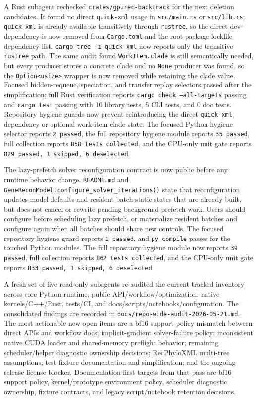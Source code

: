 \documentclass[11pt]{article}
\begin{document}
A Rust subagent rechecked \texttt{crates/gpurec-backtrack} for the next
deletion candidates.  It found no direct \texttt{quick-xml} usage in
\texttt{src/main.rs} or \texttt{src/lib.rs}; \texttt{quick-xml} is already
available transitively through \texttt{rustree}, so the direct dev-dependency is
now removed from \texttt{Cargo.toml} and the root package lockfile dependency
list.  \texttt{cargo tree -i quick-xml} now reports only the transitive
\texttt{rustree} path.  The same audit found \texttt{WorkItem.clade} is still
semantically needed, but every producer stores a concrete clade and no
\texttt{None} producer was found, so the \texttt{Option<usize>} wrapper is now
removed while retaining the clade value.  Focused hidden-requeue, speciation,
and transfer replay selectors passed after the simplification; full Rust
verification reports \texttt{cargo check --all-targets} passing and
\texttt{cargo test} passing with 10 library tests, 5 CLI tests, and 0 doc tests.
Repository hygiene guards now prevent reintroducing the direct
\texttt{quick-xml} dependency or optional work-item clade state.  The focused
Python hygiene selector reports \texttt{2 passed}, the full repository hygiene
module reports \texttt{35 passed}, full collection reports
\texttt{858 tests collected}, and the CPU-only unit gate reports
\texttt{829 passed, 1 skipped, 6 deselected}.

The lazy-prefetch solver reconfiguration contract is now public before any
runtime behavior change.  \texttt{README.md} and
\texttt{GeneReconModel.configure\_solver\_iterations()} state that
reconfiguration updates model defaults and resident batch static states that are
already built, but does not cancel or rewrite pending background prefetch work.
Users should configure before scheduling lazy prefetch, or materialize resident
batches and configure again when all batches should share new controls.  The
focused repository hygiene guard reports \texttt{1 passed}, and
\texttt{py\_compile} passes for the touched Python modules.  The full
repository hygiene module now reports \texttt{39 passed}, full collection
reports \texttt{862 tests collected}, and the CPU-only unit gate reports
\texttt{833 passed, 1 skipped, 6 deselected}.

A fresh set of five read-only subagents re-audited the current tracked
inventory across core Python runtime, public API/workflow/optimization, native
kernels/C++/Rust, tests/CI, and docs/scripts/notebooks/configuration.  The
consolidated findings are recorded in
\texttt{docs/repo-wide-audit-2026-05-21.md}.  The most actionable new open
items are a bf16 support-policy mismatch between direct APIs and workflow docs;
implicit-gradient solver-failure policy; inconsistent native CUDA loader and
shared-memory preflight behavior; remaining scheduler/helper diagnostic
ownership decisions; RecPhyloXML
multi-tree assumptions; test fixture documentation and simplification; and the
ongoing release license blocker.  Documentation-first targets from that pass
are bf16 support policy, kernel/prototype environment policy, scheduler
diagnostic ownership, fixture contracts, and legacy script/notebook retention
decisions.
\end{document}
